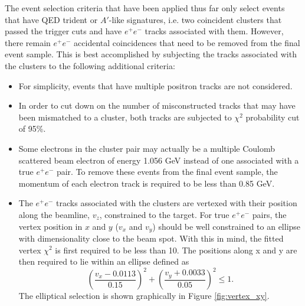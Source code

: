 The event selection criteria that have been applied thus far only select 
events that have QED trident or $A'$-like signatures, i.e. two coincident clusters that
passed the trigger cuts and have $e^+e^-$ tracks associated with them.  However, 
there remain $e^+e^-$ accidental coincidences that need to be removed from the final 
event sample.  This is best accomplished by subjecting the tracks associated 
with the clusters to the following additional criteria:
\begin{itemize}
    \item For simplicity, events that have multiple positron tracks are not 
          considered.
    \item In order to cut down on the number of misconstructed tracks that may
          have been mismatched to a cluster, both tracks are subjected to 
          $\chi^2$ probability cut of 95\%.
    \item Some electrons in the cluster pair may actually be a multiple
          Coulomb scattered beam electron of energy 1.056 GeV 
          instead of one associated with a true $e^+e^-$ 
          pair.  To remove these events from the final event sample, the 
          momentum of each electron track is required to be less than 0.85 GeV.
    \item The $e^+e^-$ tracks associated with the clusters are vertexed with 
          their position along the beamline, $v_z$, constrained to the target. 
          For true $e^+e^-$ pairs, the vertex position in $x$ and $y$ ($v_x$ and $v_y$) should be
          well constrained to an ellipse with dimensionality close to the beam 
          spot.  With this in mind, the fitted vertex $\chi^2$ is first required 
          to be less than 10.  The positions along x and y are then required 
          to lie within an ellipse 
          defined as
          \[
          \left (\frac{v_x - 0.0113}{0.15} \right)^2 + \left(\frac{v_y + 0.0033}{0.05} \right)^2  \le 1.
          \]
          The elliptical selection is shown graphically in Figure \ref{fig:vertex_xy}.
\end{itemize}

